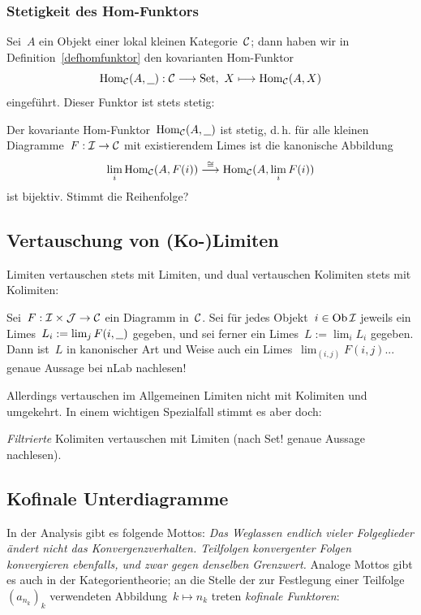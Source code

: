 \subsubsection{Stetigkeit des Hom-Funktors}

Sei~$A$ ein Objekt einer lokal kleinen Kategorie~$\mathcal{C}$; dann haben wir in
Definition~\ref{defhomfunktor} den kovarianten Hom-Funktor
\[ \mathrm{Hom}_{\mathcal{C}}(A, \underline{\ \ }) : \mathcal{C} \longrightarrow \mathrm{Set},\ X \longmapsto \mathrm{Hom}_{\mathcal{C}}(A,X) \]
eingeführt. Dieser Funktor ist stets stetig:
\begin{prop}Der kovariante Hom-Funktor~$\mathrm{Hom}_{\mathcal{C}}(A,\underline{\ \ })$ ist stetig, d.\,h.
für alle kleinen Diagramme~$F : \mathcal{I} \to \mathcal{C}$ mit existierendem Limes ist die
kanonische Abbildung
\[ \lim_i \mathrm{Hom}_{\mathcal{C}}(A, F(i)) \stackrel{\cong}{\longrightarrow} \mathrm{Hom}_{\mathcal{C}}(A, \lim_i F(i)) \]
ist bijektiv. Stimmt die Reihenfolge?
\end{prop}


\subsection{Vertauschung von (Ko-)Limiten}

Limiten vertauschen stets mit Limiten, und dual vertauschen Kolimiten stets mit Kolimiten:
\begin{prop}
Sei~$F : \mathcal{I} \times \mathcal{J} \to \mathcal{C}$ ein Diagramm in~$\mathcal{C}$. Sei für jedes Objekt~$i \in
\operatorname{Ob}\mathcal{I}$ jeweils ein Limes~$L_i := \lim_j F(i, \underline{\ \ })$ gegeben, und sei ferner
ein Limes~$L := \lim_i L_i$ gegeben. Dann ist~$L$ in kanonischer Art und Weise
auch ein Limes~$\lim_{(i,j)} F(i,j)$... genaue Aussage bei nLab nachlesen!
\end{prop}

Allerdings vertauschen im Allgemeinen Limiten nicht mit Kolimiten und
umgekehrt. In einem wichtigen Spezialfall stimmt es aber doch:
\begin{prop}\emph{Filtrierte} Kolimiten vertauschen mit Limiten (nach Set!
genaue Aussage nachlesen).
\end{prop}


\subsection{Kofinale Unterdiagramme}

In der Analysis gibt es folgende Mottos: \emph{Das Weglassen endlich vieler Folgeglieder
ändert nicht das Konvergenzverhalten. Teilfolgen konvergenter Folgen
konvergieren ebenfalls, und zwar gegen denselben Grenzwert.} Analoge Mottos
gibt es auch in der Kategorientheorie; an die Stelle der zur Festlegung einer
Teilfolge~$(a_{n_k})_k$ verwendeten Abbildung~$k \mapsto n_k$ treten
\emph{kofinale Funktoren}:


